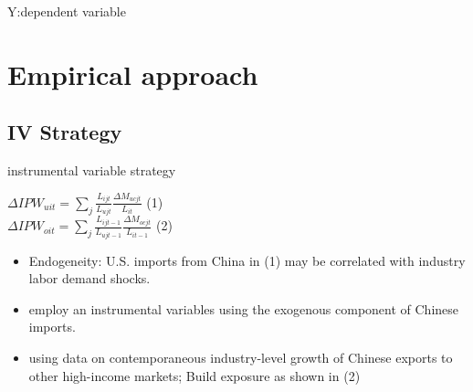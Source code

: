 \documentclass[10pt,aspectratio=43,mathserif,table]{beamer}
\begin{document}
\begin{frame}{Y:dependent variable}
	\centering
\end{frame}




\section{Empirical approach}
\subsection{IV Strategy}
\begin{frame}{instrumental variable strategy}
	\begin{center}
		\Large $\Delta IPW_{uit}=\sum_{j} \frac{L_{ijt}}{L_{ujt}} \frac{\Delta M_{ucjt}}{L_{it}} $     (1)
		\\[5mm]
		\Large $\Delta IPW_{oit}=\sum_{j} \frac{L_{ijt-1}}{L_{ujt-1}} \frac{\Delta M_{ocjt}}{L_{it-1}} $   (2)
	\end{center}
	\begin{itemize}
		\item<0-> Endogeneity: U.S. imports from China in (1) may be correlated with industry labor demand shocks.
		\item<0-> employ an instrumental variables using the exogenous component of Chinese imports.
		\item<0-> using data on contemporaneous industry-level growth of Chinese exports to other high-income markets; Build exposure as shown in (2)
	\end{itemize}
\end{frame}
\end{document}
